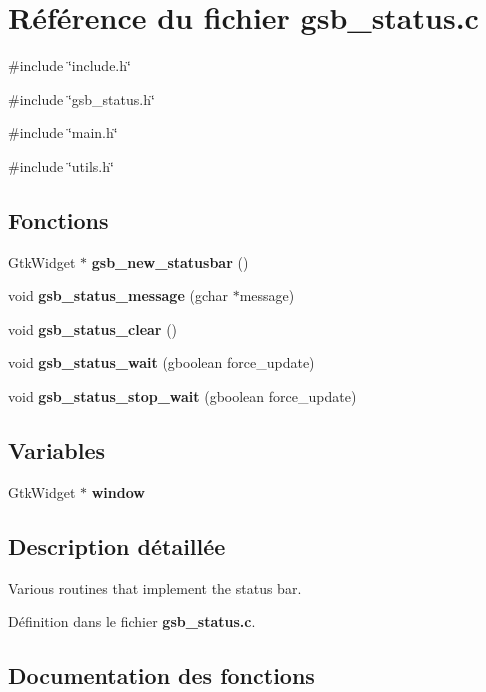 \section{Référence du fichier gsb\_\-status.c}
\label{gsb__status_8c}
{\ttfamily \#include \char`\"{}include.h\char`\"{}}\par
{\ttfamily \#include \char`\"{}gsb\_\-status.h\char`\"{}}\par
{\ttfamily \#include \char`\"{}main.h\char`\"{}}\par
{\ttfamily \#include \char`\"{}utils.h\char`\"{}}\par
\subsection*{Fonctions}
\begin{DoxyCompactItemize}
\item 
GtkWidget $\ast$ {\bf gsb\_\-new\_\-statusbar} ()
\item 
void {\bf gsb\_\-status\_\-message} (gchar $\ast$message)
\item 
void {\bf gsb\_\-status\_\-clear} ()
\item 
void {\bf gsb\_\-status\_\-wait} (gboolean force\_\-update)
\item 
void {\bf gsb\_\-status\_\-stop\_\-wait} (gboolean force\_\-update)
\end{DoxyCompactItemize}
\subsection*{Variables}
\begin{DoxyCompactItemize}
\item 
GtkWidget $\ast$ {\bf window}
\end{DoxyCompactItemize}


\subsection{Description détaillée}
Various routines that implement the status bar. 

Définition dans le fichier {\bf gsb\_\-status.c}.



\subsection{Documentation des fonctions}

